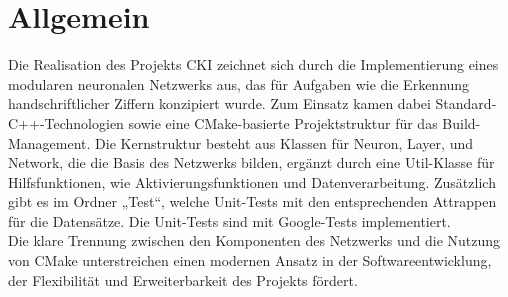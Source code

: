 \section{Allgemein}
\label{sec:RealAllgemein}
Die Realisation des Projekts CKI zeichnet sich durch die Implementierung eines modularen neuronalen Netzwerks aus, das für Aufgaben wie die Erkennung handschriftlicher Ziffern konzipiert wurde. Zum Einsatz kamen dabei Standard-C++-Technologien sowie eine CMake-basierte Projektstruktur für das Build-Management. Die Kernstruktur besteht aus Klassen für Neuron, Layer, und Network, die die Basis des Netzwerks bilden, ergänzt durch eine Util-Klasse für Hilfsfunktionen, wie Aktivierungsfunktionen und Datenverarbeitung.
Zusätzlich gibt es im Ordner „Test“, welche Unit-Tests mit den entsprechenden Attrappen für die Datensätze. Die Unit-Tests sind mit Google-Tests implementiert.
\\
Die klare Trennung zwischen den Komponenten des Netzwerks und die Nutzung von CMake unterstreichen einen modernen Ansatz in der Softwareentwicklung, der Flexibilität und Erweiterbarkeit des Projekts fördert. 

